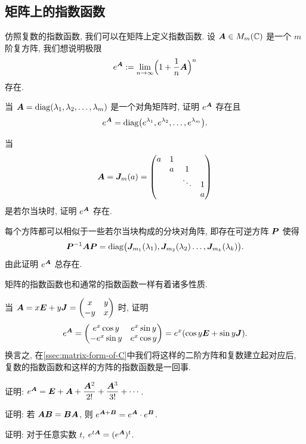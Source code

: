 \subsection{矩阵上的指数函数}
仿照复数的指数函数, 我们可以在矩阵上定义指数函数.
设 ${\boldsymbol{A}}\in M_m({\mathbb{C}})$ 是一个 $m$ 阶复方阵, 我们想说明极限
\[e^{\boldsymbol{A}}:=\lim_{n\to \infty}\Bigl(1+\frac1n {\boldsymbol{A}}\Bigr)^n\]
存在.
\begin{subex}
  \item 当 ${\boldsymbol{A}}={\mathrm{diag}}(\lambda_1,\lambda_2,\dots,\lambda_m)$ 是一个对角矩阵时, 证明 $e^{\boldsymbol{A}}$ 存在且
  \[
    e^{\boldsymbol{A}}={\mathrm{diag}}\bigl(e^{\lambda_1},e^{\lambda_2},\dots,e^{\lambda_m}\bigr).
  \]
  \item 当
  \[{\boldsymbol{A}}={\boldsymbol{J}}_m(a)=\begin{pmatrix}
    a&1&   &\\
    &a& 1 &\\
    & &\ddots&1\\
    & &      &a
  \end{pmatrix}\]
  是若尔当块时, 证明 $e^{\boldsymbol{A}}$ 存在.
  \item 每个方阵都可以相似于一些若尔当块构成的分块对角阵, 即存在可逆方阵 ${\boldsymbol{P}}$ 使得
  \[
    {\boldsymbol{P}}^{-1}{\boldsymbol{A}}{\boldsymbol{P}}={\mathrm{diag}}\bigl({\boldsymbol{J}}_{m_1}(\lambda_1),{\boldsymbol{J}}_{m_2}(\lambda_2)\dots,{\boldsymbol{J}}_{m_k}(\lambda_k)\bigr).
  \]
  由此证明 $e^{\boldsymbol{A}}$ 总存在.
\end{subex}
  
矩阵的指数函数也和通常的指数函数一样有着诸多性质.
\begin{subex}
  \item 当 ${\boldsymbol{A}}=x{\boldsymbol{E}}+y{\boldsymbol{J}}=\begin{pmatrix}
    x&y\\-y&x
  \end{pmatrix}$ 时, 证明
  \[
    e^{\boldsymbol{A}}=\begin{pmatrix}
      e^x\cos y&e^x\sin y\\
      -e^x\sin y&e^x\cos y
    \end{pmatrix}=e^x(\cos y{\boldsymbol{E}}+\sin y {\boldsymbol{J}}).
  \]
  换言之, 在\ref{ssec:matrix-form-of-C}中我们将这样的二阶方阵和复数建立起对应后, 复数的指数函数和这样的方阵的指数函数是一回事.
  \item 证明: $e^{\boldsymbol{A}}={\boldsymbol{E}}+{\boldsymbol{A}}+\dfrac{{\boldsymbol{A}}^2}{2!}+\dfrac{{\boldsymbol{A}}^3}{3!}+\cdots$.
  \item 证明: 若 ${\boldsymbol{A}}{\boldsymbol{B}}={\boldsymbol{B}}{\boldsymbol{A}}$, 则 $e^{{\boldsymbol{A}}+{\boldsymbol{B}}}=e^{\boldsymbol{A}}\cdot e^{\boldsymbol{B}}$.
  \item 证明: 对于任意实数 $t$, $e^{t{\boldsymbol{A}}}=(e^{\boldsymbol{A}})^t$.
\end{subex}

